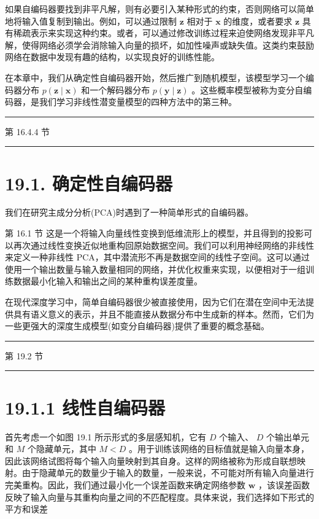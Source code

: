 \documentclass[10pt]{report}
\newcommand{\HRule}{\begin{center}\rule{0.9\linewidth}{0.2mm}\end{center}}
\begin{document}
如果自编码器要找到非平凡解，则有必要引入某种形式的约束，否则网络可以简单地将输入值复制到输出。例如，可以通过限制 \(\mathbf{z}\) 相对于 \(\mathbf{x}\) 的维度，或者要求 \(\mathbf{z}\) 具有稀疏表示来实现这种约束。或者，可以通过修改训练过程来迫使网络发现非平凡解，使得网络必须学会消除输入向量的损坏，如加性噪声或缺失值。这类约束鼓励网络在数据中发现有趣的结构，以实现良好的训练性能。

在本章中，我们从确定性自编码器开始，然后推广到随机模型，该模型学习一个编码器分布 \(p\left( {\mathbf{z} \mid  \mathbf{x}}\right)\) 和一个解码器分布 \(p\left( {\mathbf{y} \mid  \mathbf{z}}\right)\) 。这些概率模型被称为变分自编码器，是我们学习非线性潜变量模型的四种方法中的第三种。

\HRule

第 16.4.4 节

\HRule

\section*{19.1. 确定性自编码器}

我们在研究主成分分析(PCA)时遇到了一种简单形式的自编码器。

第 16.1 节 这是一个将输入向量线性变换到低维流形上的模型，并且得到的投影可以再次通过线性变换近似地重构回原始数据空间。我们可以利用神经网络的非线性来定义一种非线性 PCA，其中潜流形不再是数据空间的线性子空间。这可以通过使用一个输出数量与输入数量相同的网络，并优化权重来实现，以便相对于一组训练数据最小化输入和输出之间的某种重构误差度量。

在现代深度学习中，简单自编码器很少被直接使用，因为它们在潜在空间中无法提供具有语义意义的表示，并且不能直接从数据分布中生成新的样本。然而，它们为一些更强大的深度生成模型(如变分自编码器)提供了重要的概念基础。

\HRule

第 19.2 节

\HRule

\section*{19.1.1 线性自编码器}

首先考虑一个如图 19.1 所示形式的多层感知机，它有 \(D\) 个输入、 \(D\) 个输出单元和 \(M\) 个隐藏单元，其中 \(M < D\) 。用于训练该网络的目标值就是输入向量本身，因此该网络试图将每个输入向量映射到其自身。这样的网络被称为形成自联想映射。由于隐藏单元的数量少于输入的数量，一般来说，不可能对所有输入向量进行完美重构。因此，我们通过最小化一个误差函数来确定网络参数 \(\mathbf{w}\) ，该误差函数反映了输入向量与其重构向量之间的不匹配程度。具体来说，我们选择如下形式的平方和误差
\end{document}
